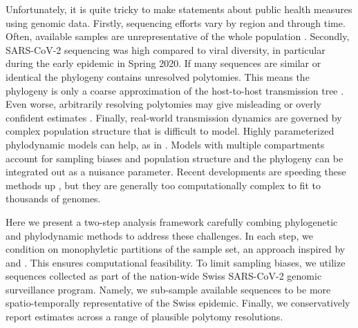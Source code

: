 \documentclass[9pt,twoside,lineno]{pnas-new} %
\begin{document}
Unfortunately, it is quite tricky to make statements about public health measures using genomic data. Firstly, sequencing efforts vary by region and through time. Often, available samples are unrepresentative of the whole population \cite{Villabona-Arenas2020, DeMaio2015}. Secondly, SARS-CoV-2 sequencing was high compared to viral diversity, in particular during the early epidemic in Spring 2020. If many sequences are similar or identical the phylogeny contains unresolved polytomies. This means the phylogeny is only a coarse approximation of the  host-to-host transmission tree \cite{Villabona-Arenas2020}. Even worse, arbitrarily resolving polytomies may give misleading or overly confident estimates \cite{Morel2021}. Finally, real-world transmission dynamics are governed by complex population structure that is difficult to model. Highly parameterized phylodynamic models can help, as in \cite{Miller2020, Geoghegan2020a, Muller2020a}. Models with multiple compartments account for sampling biases and population structure and the phylogeny can be integrated out as a nuisance parameter. Recent developments are speeding these methods up \cite{Lemey2021}, but they are generally too computationally complex to fit to thousands of genomes.

Here we present a two-step analysis framework carefully combing phylogenetic and phylodynamic methods to  address these challenges. In each step, we condition on monophyletic partitions of the sample set, an approach inspired by  \cite{Muller2020} and \cite{DuPlessis}. This ensures computational feasibility. To limit sampling biases, we utilize sequences collected as part of the nation-wide Swiss SARS-CoV-2 genomic surveillance program. Namely, we sub-sample  available sequences to be more spatio-temporally representative of the Swiss epidemic. Finally, we conservatively report estimates across a range of plausible polytomy resolutions.
\end{document}
